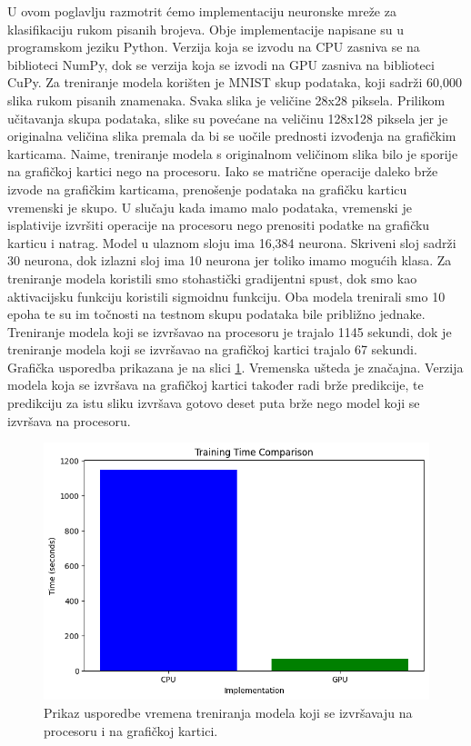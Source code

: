 \documentclass[a4paper,twocolumn]{article}
\begin{document}
	U ovom poglavlju razmotrit ćemo implementaciju neuronske mreže za klasifikaciju rukom pisanih brojeva. \cite{neural_networks} Obje implementacije napisane su u programskom jeziku Python. Verzija koja se izvodu na CPU zasniva se na biblioteci NumPy, dok se verzija koja se izvodi na GPU zasniva na biblioteci CuPy. \newline
	Za treniranje modela korišten je MNIST skup podataka, koji sadrži 60,000 slika rukom pisanih znamenaka. Svaka slika je veličine 28x28 piksela. Prilikom učitavanja skupa podataka, slike su povećane na veličinu 128x128 piksela jer je originalna veličina slika premala da bi se uočile prednosti izvođenja na grafičkim karticama. Naime, treniranje modela s originalnom veličinom slika bilo je sporije na grafičkoj kartici nego na procesoru. Iako se matrične operacije daleko brže izvode na grafičkim karticama, prenošenje podataka na grafičku karticu vremenski je skupo. U slučaju kada imamo malo podataka, vremenski je isplativije izvršiti operacije na procesoru nego prenositi podatke na grafičku karticu i natrag. \newline
	Model u ulaznom sloju ima 16,384 neurona. Skriveni sloj sadrži 30 neurona, dok izlazni sloj ima 10 neurona jer toliko imamo mogućih klasa. Za treniranje modela koristili smo stohastički gradijentni spust, dok smo kao aktivacijsku funkciju koristili sigmoidnu funkciju.
	Oba modela trenirali smo 10 epoha te su im točnosti na testnom skupu podataka bile približno jednake. Treniranje modela koji se izvršavao na procesoru je trajalo 1145 sekundi, dok je treniranje modela koji se izvršavao na grafičkoj kartici trajalo 67 sekundi. Grafička usporedba prikazana je na slici \ref{fig:cnn_training_time_comparison}. \newline
	Vremenska ušteda je značajna. Verzija modela koja se izvršava na grafičkoj kartici također radi brže predikcije, te predikciju za istu sliku izvršava gotovo deset puta brže nego model koji se izvršava na procesoru.
	
	\begin{figure}[H]
		\centering
		\includegraphics[width=0.9\linewidth]{slike/cnn_training_time_comparison.png} 
		\caption{Prikaz usporedbe vremena treniranja modela koji se izvršavaju na procesoru i na grafičkoj kartici.}
		\label{fig:cnn_training_time_comparison}
	\end{figure} 
\end{document}
